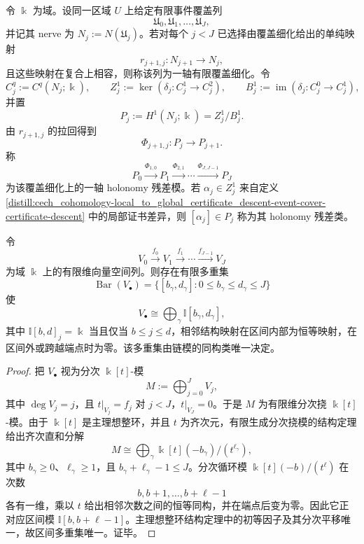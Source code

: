 \begin{definition}\label{distill:persistent_homology_persistence_modules_and_constructible_sheaf_persistence-one_parameter_barcode_decomposition-event-cover-holonomy-ledger}
令 \(\Bbbk\) 为域。设同一区域 \(U\) 上给定有限事件覆盖列
\[
\mathfrak U_0,\mathfrak U_1,\dots,\mathfrak U_J,
\]
并记其 nerve 为 \(N_j:=N(\mathfrak U_j)\)。若对每个 \(j<J\) 已选择由覆盖细化给出的单纯映射
\[
r_{j+1,j}:N_{j+1}\to N_j,
\]
且这些映射在复合上相容，则称该列为一轴有限覆盖细化。令
\[
C^q_j:=C^q(N_j;\Bbbk),\qquad
Z^1_j:=\ker(\delta_j:C^1_j\to C^2_j),\qquad
B^1_j:=\operatorname{im}(\delta_j:C^0_j\to C^1_j),
\]
并置
\[
P_j:=H^1(N_j;\Bbbk)=Z^1_j/B^1_j.
\]
由 \(r_{j+1,j}\) 的拉回得到
\[
\Phi_{j+1,j}:P_j\to P_{j+1}.
\]
称
\[
P_0\xrightarrow{\Phi_{1,0}}P_1\xrightarrow{\Phi_{2,1}}\cdots\xrightarrow{\Phi_{J,J-1}}P_J
\]
为该覆盖细化上的一轴 holonomy 残差模。若 \(\alpha_j\in Z^1_j\) 来自定义 \ref{distill:cech_cohomology-local_to_global_certificate_descent-event-cover-certificate-descent} 中的局部证书差异，则 \([\alpha_j]\in P_j\) 称为其 holonomy 残差类。
\end{definition}

\begin{lemma}[有限一参链模的区间分解]\label{distill:persistent_homology_persistence_modules_and_constructible_sheaf_persistence-one_parameter_barcode_decomposition-finite-chain-interval-decomposition}
令
\[
V_0\xrightarrow{f_0}V_1\xrightarrow{f_1}\cdots\xrightarrow{f_{J-1}}V_J
\]
为域 \(\Bbbk\) 上的有限维向量空间列。则存在有限多重集
\[
\operatorname{Bar}(V_\bullet)=\{[b_\gamma,d_\gamma]:0\le b_\gamma\le d_\gamma\le J\}
\]
使
\[
V_\bullet\cong\bigoplus_\gamma \mathbb I[b_\gamma,d_\gamma],
\]
其中 \(\mathbb I[b,d]_j=\Bbbk\) 当且仅当 \(b\le j\le d\)，相邻结构映射在区间内部为恒等映射，在区间外或跨越端点时为零。该多重集由链模的同构类唯一决定。
\end{lemma}
\begin{proof}
把 \(V_\bullet\) 视为分次 \(\Bbbk[t]\)-模
\[
M:=\bigoplus_{j=0}^{J}V_j,
\]
其中 \(\deg V_j=j\)，且 \(t|_{V_j}=f_j\) 对 \(j<J\)，\(t|_{V_J}=0\)。于是 \(M\) 为有限维分次挠 \(\Bbbk[t]\)-模。由于 \(\Bbbk[t]\) 是主理想整环，并且 \(t\) 为齐次元，有限生成分次挠模的结构定理给出齐次直和分解
\[
M\cong\bigoplus_\gamma \Bbbk[t](-b_\gamma)/(t^{\ell_\gamma}),
\]
其中 \(b_\gamma\ge0\)、\(\ell_\gamma\ge1\)，且 \(b_\gamma+\ell_\gamma-1\le J\)。分次循环模 \(\Bbbk[t](-b)/(t^\ell)\) 在次数
\[
b,b+1,\dots,b+\ell-1
\]
各有一维，乘以 \(t\) 给出相邻次数之间的恒等同构，并在端点后变为零。因此它正对应区间模 \(\mathbb I[b,b+\ell-1]\)。主理想整环结构定理中的初等因子及其分次平移唯一，故区间多重集唯一。证毕。
\end{proof}

